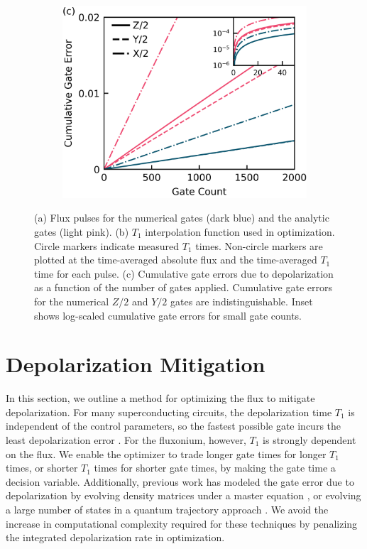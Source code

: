 \documentclass[
  amsfonts,
  amsmath,
  amssymb,
  pra,
  twocolumn,
  superscriptaddress,
]{revtex4-2}
\begin{document}
\begin{figure}[ht]
\begin{subfigure}{.23\textwidth}
    \caption{\label{fig:longitudeb}}
  \end{subfigure}\hfill
  \begin{subfigure}{.4\textwidth}
    \includegraphics[width=\linewidth]{f1c.png}
    \caption{\label{fig:longitudec}}
  \end{subfigure}
  \caption{
    (a) Flux pulses for the numerical gates (dark blue)
    and the analytic gates (light pink).
    (b) $T_{1}$ interpolation function used in optimization. Circle markers
    indicate measured $T_{1}$ times. Non-circle markers
    are plotted at the time-averaged 
    absolute flux and the time-averaged $T_{1}$ time for each pulse.
    (c) Cumulative gate errors due to depolarization as a function of the
    number of gates applied.
    Cumulative gate errors for the numerical $Z/2$ and $Y/2$ gates
    are indistinguishable. Inset shows log-scaled cumulative gate errors
    for small gate counts.
  }
  \label{fig:longitude}
\end{figure}

\section{Depolarization Mitigation\label{sec:longitude}}
In this section, we outline a method
for optimizing the flux to mitigate depolarization.
For many superconducting circuits, the depolarization time
$T_{1}$ is independent of the control parameters,
so the fastest possible gate incurs the least depolarization error
\cite{schulteherbruggen2011optimal}.
For the fluxonium, however, $T_{1}$ is strongly dependent on the flux.
We enable the optimizer to trade longer gate times
for longer $T_{1}$ times, or shorter $T_{1}$ times for shorter gate times,
by making the gate time a decision variable.
Additionally, previous work has modeled the gate error due to depolarization
by evolving density matrices under a master
equation \cite{rembold2020introduction, schulteherbruggen2011optimal},
or evolving a large number of states in a quantum trajectory approach
\cite{abdelhafez2019gradient}.
We avoid the increase in computational complexity required for these
techniques by penalizing the integrated depolarization rate in optimization.
\end{document}
